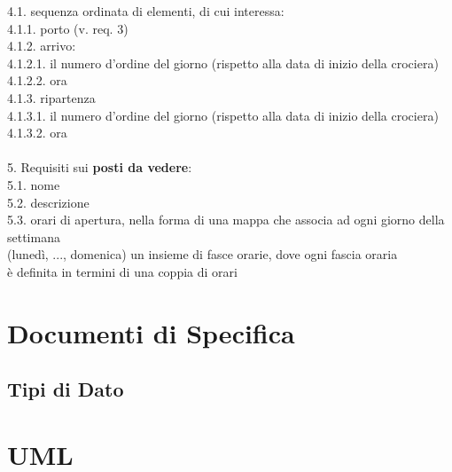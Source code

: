 \documentclass[12pt, letterpaper]{article}
\newcommand{\acc}{\\\hphantom{}\\}
\begin{document}
\hphantom{ident}4.1. sequenza ordinata di elementi, di cui interessa:\\
\hphantom{ident}\hphantom{ident}4.1.1. porto (v. req. 3)\\
\hphantom{ident}\hphantom{ident}4.1.2. arrivo:\\
\hphantom{ident}\hphantom{ident}\hphantom{ident}4.1.2.1. il numero d'ordine del giorno (rispetto alla data di inizio della crociera)\\
\hphantom{ident}\hphantom{ident}\hphantom{ident}4.1.2.2. ora\\
\hphantom{ident}\hphantom{ident}4.1.3. ripartenza	\\
\hphantom{ident}\hphantom{ident}\hphantom{ident}4.1.3.1. il numero d'ordine del giorno (rispetto alla data di inizio della crociera)\\
\hphantom{ident}\hphantom{ident}\hphantom{ident}4.1.3.2. ora
\acc
5. Requisiti sui \textbf{posti da vedere}:\\
\hphantom{ident}5.1. nome\\
\hphantom{ident}5.2. descrizione\\
\hphantom{ident}5.3. orari di apertura, nella forma di una mappa che associa ad ogni giorno della settimana\\
\hphantom{ident}\hphantom{ident}(lunedì, ..., domenica) un insieme di fasce orarie, dove ogni fascia oraria\\
\hphantom{ident}\hphantom{ident}è definita in termini di una coppia di orari

\newpage
\section{Documenti di Specifica}
\subsection{Tipi di Dato}


\newpage
\section{UML}\begin{center}
    
\end{center}
\end{document}
